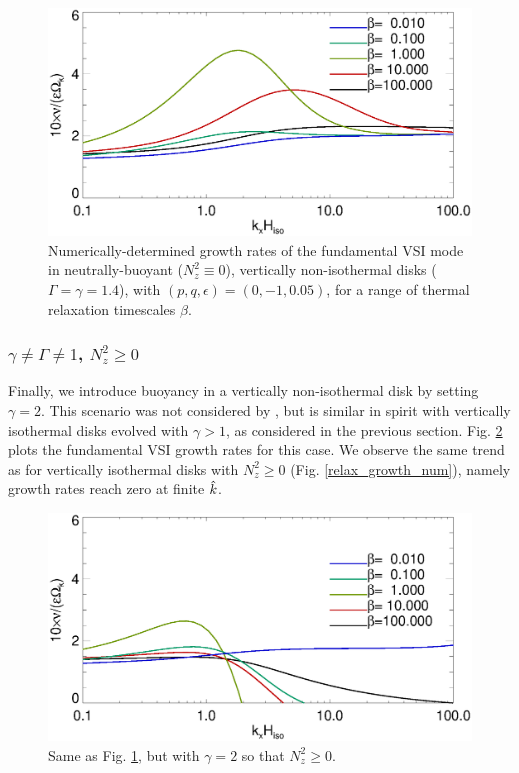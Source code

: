 \begin{figure}
  \includegraphics[width=\linewidth,clip=true,trim=0cm 0cm 0cm
  0cm]{figures/growth_vnoniso1} 
  \caption{Numerically-determined growth rates of the fundamental VSI
    mode in neutrally-buoyant ($N_z^2\equiv0$), vertically non-isothermal disks
    ($\Gamma=\gamma=1.4$), with $(p,q,\epsilon)=(0,-1,0.05)$, for
    a range of thermal relaxation timescales 
    $\beta$. \label{growth_vnoniso1}}     
\end{figure} 

\subsubsection{$\gamma\neq\Gamma \neq 1$, $N_z^2\geq0$}
Finally, we introduce buoyancy in a vertically non-isothermal disk by
setting $\gamma=2$. This scenario was not considered by  
\cite{nelson13}, but is similar in spirit with vertically isothermal 
disks evolved with $\gamma>1$, as considered in the previous section. 
Fig. \ref{growth_vnoniso2} plots the fundamental VSI growth rates for
this case. We observe the same trend as for vertically isothermal
disks with $N_z^2\geq 0$ (Fig. \ref{relax_growth_num}), namely growth
rates reach zero at finite $\hat{k}$. 

\begin{figure}
  \includegraphics[width=\linewidth,clip=true,trim=0cm 0cm 0cm
  0cm]{figures/growth_vnoniso2}
  \caption{Same as Fig. \ref{growth_vnoniso1}, but with $\gamma=2$ so that
    $N_z^2\geq0$. \label{growth_vnoniso2}}
\end{figure} 

 
